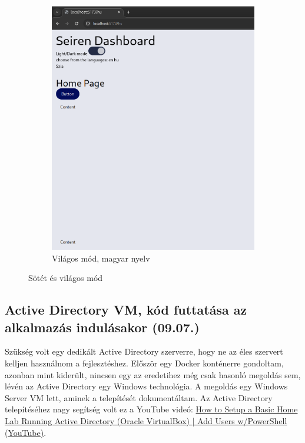 \documentclass[a4paper]{article}
\begin{document}
\begin{figure}[ht]
\begin{subfigure}[b]{0.45\textwidth}
        \includegraphics[clip, trim = 0 24 0 0, width=\textwidth]{images/light_preview.png}
        \caption{Világos mód, magyar nyelv}
        \label{fig:light_mode}
    \end{subfigure}
    \caption{Sötét és világos mód}
    \label{fig:dark_light_modes}
\end{figure}

\subsection{Active Directory VM, kód futtatása az alkalmazás indulásakor (09.07.)}

Szükség volt egy dedikált Active Directory szerverre, hogy ne az éles szervert kelljen használnom a
fejlesztéshez. Először egy Docker konténerre gondoltam, azonban mint kiderült, nincsen egy az
eredetihez még csak hasonló megoldás sem, lévén az Active Directory egy Windows technológia. A
megoldás egy Windows Server VM lett, aminek a telepítését dokumentáltam. Az Active Directory
telepítéséhez nagy segítség volt ez a YouTube videó: \href{https://youtu.be/MHsI8hJmggI?si=t0c5f8Z-
2RUdvrnV}{ How to Setup a Basic Home Lab Running Active Directory (Oracle VirtualBox) | Add Users w/PowerShell (YouTube)}.
\end{document}
